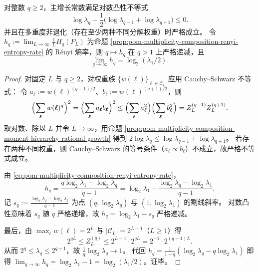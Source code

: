 \begin{proposition}\label{prop:pom-multiplicity-composition-logconvex-lambdaq}
对整数 \(q\ge 2\)，主增长常数满足对数凸性不等式
\[
\boxed{\;
\log \lambda_q-\frac12\bigl(\log \lambda_{q-1}+\log \lambda_{q+1}\bigr)\le 0.\;}
\]
并且在多重度非退化（存在至少两种不同分解权重）时严格成立。
令
\(
h_q:=\lim_{L\to\infty}\frac{1}{L}H_q(P_L)
\)
为命题 \ref{prop:pom-multiplicity-composition-renyi-entropy-rate} 的 Rényi 熵率，则 \(q\mapsto h_q\) 在 \(q>1\) 上严格递减，且
\[
\boxed{\;
\lim_{q\to\infty}h_q=\log_2(\lambda_1/2).\;}
\]
\end{proposition}
\begin{proof}
对固定 \(L\) 与 \(q\ge 2\)，对权重族 \(\{w(\boldsymbol{\ell})\}_{\boldsymbol{\ell}\in\mathcal{C}_L}\) 应用 Cauchy--Schwarz 不等式：
令 \(a_{\boldsymbol{\ell}}:=w(\boldsymbol{\ell})^{(q-1)/2}\)、\(b_{\boldsymbol{\ell}}:=w(\boldsymbol{\ell})^{(q+1)/2}\)，则
\[
\Bigl(\sum_{\boldsymbol{\ell}}w(\boldsymbol{\ell})^{q}\Bigr)^2
=\Bigl(\sum_{\boldsymbol{\ell}}a_{\boldsymbol{\ell}}b_{\boldsymbol{\ell}}\Bigr)^2
\le
\Bigl(\sum_{\boldsymbol{\ell}}a_{\boldsymbol{\ell}}^2\Bigr)\Bigl(\sum_{\boldsymbol{\ell}}b_{\boldsymbol{\ell}}^2\Bigr)
=Z_L^{(q-1)}Z_L^{(q+1)}.
\]
取对数、除以 \(L\) 并令 \(L\to\infty\)，用命题 \ref{prop:pom-multiplicity-composition-moment-hierarchy-rational-growth} 得到
\(
2\log\lambda_q\le \log\lambda_{q-1}+\log\lambda_{q+1}
\)。
若存在两种不同权重，则 Cauchy--Schwarz 的等号条件（\(a_{\boldsymbol{\ell}}\propto b_{\boldsymbol{\ell}}\)）不成立，故严格不等式成立。
\par
由 \eqref{eq:pom-multiplicity-composition-renyi-entropy-rate}，
\[
h_q
=\frac{q\log_2\lambda_1-\log_2\lambda_q}{q-1}
=\log_2\lambda_1-\frac{\log_2\lambda_q-\log_2\lambda_1}{q-1}.
\]
记 \(s_q:=\frac{\log_2\lambda_q-\log_2\lambda_1}{q-1}\) 为点 \((q,\log_2\lambda_q)\) 与 \((1,\log_2\lambda_1)\) 的割线斜率。
对数凸性意味着 \(s_q\) 随 \(q\) 严格递增，故 \(h_q=\log_2\lambda_1-s_q\) 严格递减。
\par
最后，由 \(\max_{\boldsymbol{\ell}}w(\boldsymbol{\ell})=2^L\) 与 \(|\mathcal{C}_L|=2^{L-1}\)（\(L\ge 1\)）得
\[
2^{qL}\le Z_L^{(q)}\le 2^{L-1}\cdot 2^{qL}=2^{-1}\cdot 2^{(q+1)L}.
\]
从而 \(2^q\le \lambda_q\le 2^{q+1}\)，故 \(\frac{1}{q}\log_2\lambda_q\to 1\)。
代回 \(h_q=\frac{1}{1-q}(\log_2\lambda_q-q\log_2\lambda_1)\) 即得
\(
\lim_{q\to\infty}h_q=\log_2\lambda_1-1=\log_2(\lambda_1/2)
\)。证毕。
\end{proof}

\endinput
